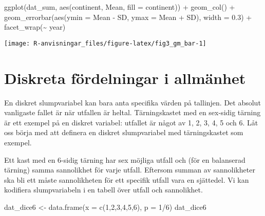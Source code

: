 \documentclass[
]{book}
\newenvironment{Shaded}{\begin{snugshade}}{\end{snugshade}}
\newcommand{\AttributeTok}[1]{\textcolor[rgb]{0.77,0.63,0.00}{#1}}
\newcommand{\DecValTok}[1]{\textcolor[rgb]{0.00,0.00,0.81}{#1}}
\newcommand{\FloatTok}[1]{\textcolor[rgb]{0.00,0.00,0.81}{#1}}
\newcommand{\FunctionTok}[1]{\textcolor[rgb]{0.00,0.00,0.00}{#1}}
\newcommand{\NormalTok}[1]{#1}
\newcommand{\OtherTok}[1]{\textcolor[rgb]{0.56,0.35,0.01}{#1}}
\newcommand{\SpecialCharTok}[1]{\textcolor[rgb]{0.00,0.00,0.00}{#1}}
\theoremstyle{definition}
\theoremstyle{definition}
\theoremstyle{definition}
\theoremstyle{definition}
\theoremstyle{remark}
\begin{document}
\begin{Shaded}
\begin{Highlighting}[]
\FunctionTok{ggplot}\NormalTok{(dat\_sum, }\FunctionTok{aes}\NormalTok{(continent, Mean, }\AttributeTok{fill =}\NormalTok{ continent)) }\SpecialCharTok{+}
  \FunctionTok{geom\_col}\NormalTok{() }\SpecialCharTok{+}
  \FunctionTok{geom\_errorbar}\NormalTok{(}\FunctionTok{aes}\NormalTok{(}\AttributeTok{ymin =}\NormalTok{ Mean }\SpecialCharTok{{-}}\NormalTok{ SD, }\AttributeTok{ymax =}\NormalTok{ Mean }\SpecialCharTok{+}\NormalTok{ SD), }\AttributeTok{width =} \FloatTok{0.3}\NormalTok{) }\SpecialCharTok{+}
  \FunctionTok{facet\_wrap}\NormalTok{(}\SpecialCharTok{\textasciitilde{}}\NormalTok{ year)}
\end{Highlighting}
\end{Shaded}

\begin{center}\texttt{[image: R-anvisningar\_files/figure-latex/fig3\_gm\_bar-1]} \end{center}

\hypertarget{diskreta-fuxf6rdelningar-i-allmuxe4nhet}{%
\section{Diskreta fördelningar i allmänhet}\label{diskreta-fuxf6rdelningar-i-allmuxe4nhet}}

En diskret slumpvariabel kan bara anta specifika värden på tallinjen. Det absolut vanligaste fallet är när utfallen är heltal. Tärningskastet med en sex-sidig tärning är ett exempel på en diskret variabel: utfallet är något av 1, 2, 3, 4, 5 och 6. Låt oss börja med att definera en diskret slumpvariabel med tärningskastet som exempel.

Ett kast med en 6-sidig tärning har sex möjliga utfall och (för en balanserad tärning) samma sannolikhet för varje utfall. Eftersom summan av sannolikheter ska bli ett måste sannolikheten för ett specifik utfall vara en sjättedel. Vi kan kodifiera slumpvariabeln i en tabell över utfall och sannolikhet.

\begin{Shaded}
\begin{Highlighting}[]
\NormalTok{dat\_dice6 }\OtherTok{\textless{}{-}} \FunctionTok{data.frame}\NormalTok{(}\AttributeTok{x =} \FunctionTok{c}\NormalTok{(}\DecValTok{1}\NormalTok{,}\DecValTok{2}\NormalTok{,}\DecValTok{3}\NormalTok{,}\DecValTok{4}\NormalTok{,}\DecValTok{5}\NormalTok{,}\DecValTok{6}\NormalTok{),}
                        \AttributeTok{p =} \DecValTok{1}\SpecialCharTok{/}\DecValTok{6}\NormalTok{)}
\NormalTok{dat\_dice6}
\end{Highlighting}
\end{Shaded}
\end{document}
